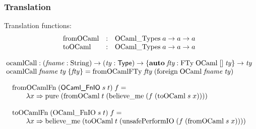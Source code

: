 \documentclass[aspectratio=169]{beamer}
\begin{document}
\begin{frame}[t]
  \frametitle{Translation}

  Translation functions:
  \begin{displaymath}
    \begin{array}{@{}lcl}
      \textrm{fromOCaml} &:& \textrm{OCaml\_Types}\; a \to a \to a \\
      \textrm{toOCaml} &:& \textrm{OCaml\_Types}\; a \to a \to a
    \end{array}
  \end{displaymath}

  \pause
  \bigskip

  \begin{displaymath}
    \begin{array}{@{}l}
      \mathrm{ocamlCall} : (\mathit{fname} : \mathrm{String}) \to (\mathit{ty} : \textsf{Type}) \to
      \{\textbf{auto}\;\textit{fty} : \textrm{FTy}\;\textrm{OCaml}\; []\; \mathit{ty}\} \to \mathit{ty}\\
      \textrm{ocamlCall}\; \mathit{fname}\; \mathit{ty}\; \{\mathit{fty}\} = \mathrm{fromOCamlFTy}\; \mathit{fty}\; (\mathrm{foreign}\; \mathrm{OCaml}\; \mathit{fname}\; \mathit{ty})
    \end{array}
  \end{displaymath}

  \bigskip
  \pause

  \begin{displaymath}
    \begin{array}{@{}l}
      \textrm{fromOCamlFn}\; (\textsf{OCaml\_FnIO}\; s\; t)\;   f = \\
      \qquad \lambda x \Rightarrow \mathrm{pure}\; (\mathrm{fromOCaml}\; t\; (\mathrm{believe\_me}\; (f\; (\mathrm{toOCaml}\; s\; x)))) \\
      \ \\
      \textrm{toOCamlFn}\; (\textrm{OCaml\_FnIO}\; s\; t)\;   f = \\
      \qquad \lambda x \Rightarrow \textrm{believe\_me}\; (\textrm{toOCaml}\; t\; (\textrm{unsafePerformIO}\; (f\; (\textrm{fromOCaml}\; s\; x))))
    \end{array}
  \end{displaymath}
\end{frame}
\end{document}
